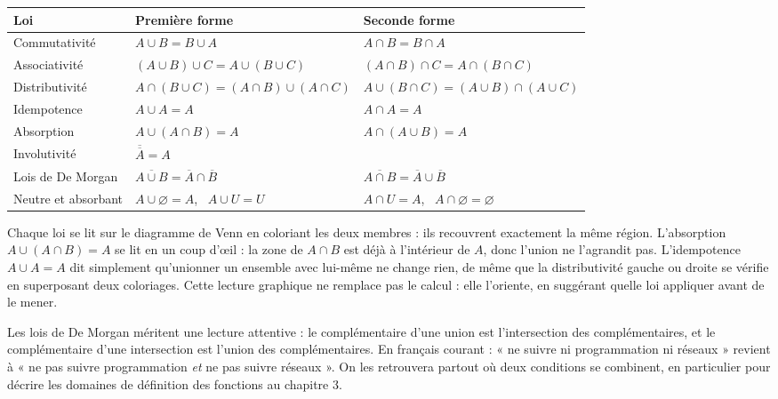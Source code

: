 \begin{center}
\small
\begin{tabular}{L{4.0cm}L{5.4cm}L{5.4cm}}
\toprule
{}\textbf{Loi} & \textbf{Première forme} & \textbf{Seconde forme}\\
\midrule
Commutativité & $A \cup B = B \cup A$ & $A \cap B = B \cap A$\\
Associativité & $(A \cup B) \cup C = A \cup (B \cup C)$ & $(A \cap B) \cap C = A \cap (B \cap C)$\\
Distributivité & $A \cap (B \cup C) = (A \cap B) \cup (A \cap C)$ & $A \cup (B \cap C) = (A \cup B) \cap (A \cup C)$\\
Idempotence & $A \cup A = A$ & $A \cap A = A$\\
Absorption & $A \cup (A \cap B) = A$ & $A \cap (A \cup B) = A$\\
Involutivité & \\
Lois de De Morgan & $\overline{A \cup B} = \overline{A} \cap \overline{B}$ & $\overline{A \cap B} = \overline{A} \cup \overline{B}$\\
Neutre et absorbant & $A \cup \varnothing = A$, \ $A \cup U = U$ & $A \cap U = A$, \ $A \cap \varnothing = \varnothing$\\
\bottomrule
\end{tabular}
\label{ch1:tab:lois}
\end{center}

Chaque loi se lit sur le diagramme de Venn en coloriant les deux membres : ils recouvrent exactement la même région. L'absorption $A \cup (A \cap B) = A$ se lit en un coup d'œil : la zone de $A \cap B$ est déjà à l'intérieur de $A$, donc l'union ne l'agrandit pas. L'idempotence $A \cup A = A$ dit simplement qu'unionner un ensemble avec lui-même ne change rien, de même que la distributivité gauche ou droite se vérifie en superposant deux coloriages. Cette lecture graphique ne remplace pas le calcul : elle l'oriente, en suggérant quelle loi appliquer avant de le mener.

Les lois de De Morgan méritent une lecture attentive : le complémentaire d'une union est l'intersection des complémentaires, et le complémentaire d'une intersection est l'union des complémentaires. En français courant : « ne suivre ni programmation ni réseaux » revient à « ne pas suivre programmation \emph{et} ne pas suivre réseaux ». On les retrouvera partout où deux conditions se combinent, en particulier pour décrire les domaines de définition des fonctions au chapitre 3.

